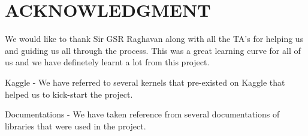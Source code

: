 \documentclass[12pt]{article}
\begin{document}
\addtolength{\textheight}{-12cm}   %








\section*{ACKNOWLEDGMENT}

We would like to thank Sir GSR Raghavan along with all the TA's for helping us and guiding us all through the process. This was a great learning curve for all of us and we have definetely learnt a lot from this project.






\begin{thebibliography}{99}

 Kaggle - We have referred to several kernels that pre-existed on Kaggle that helped us to kick-start the project.

 Documentations - We have taken reference from several documentations of libraries that were used in the project.

\end{thebibliography}
\end{document}
